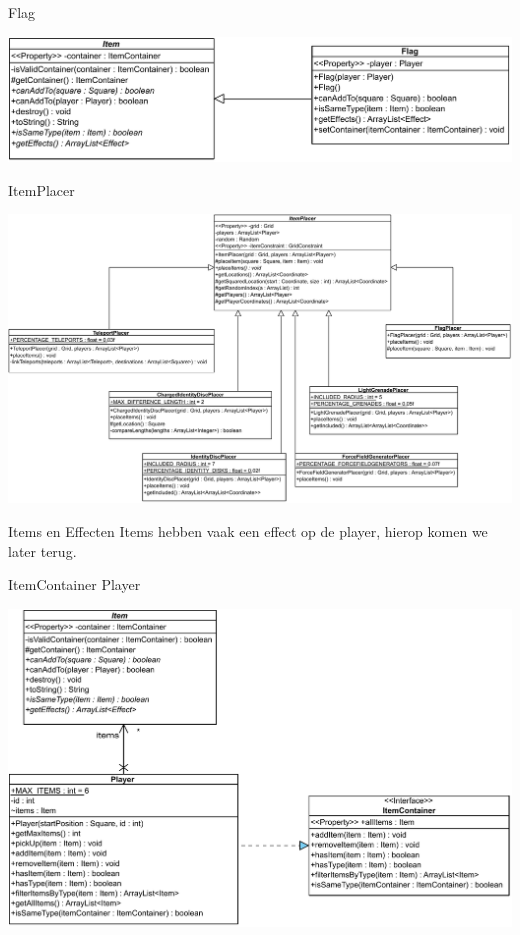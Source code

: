 \documentclass[11pt,t]{beamer}
\begin{document}
\begin{frame}{Flag}
\vspace{0.45in}
\begin{center}
\includegraphics[width=0.95\linewidth]{images/Flag}
\end{center}
\end{frame}

\begin{frame}{ItemPlacer}
\begin{center}
\includegraphics[width=0.95\linewidth]{images/itemplacer}
\end{center}
\end{frame}

\begin{frame}{Items en Effecten}
\vspace{1.5in}
Items hebben vaak een effect op de player, hierop komen we later terug.
\end{frame}

\begin{frame}{ItemContainer}
Player
\begin{center}
\includegraphics[width=0.85\linewidth]{images/playeritemcontainer}
\end{center}
\end{frame}
\end{document}
